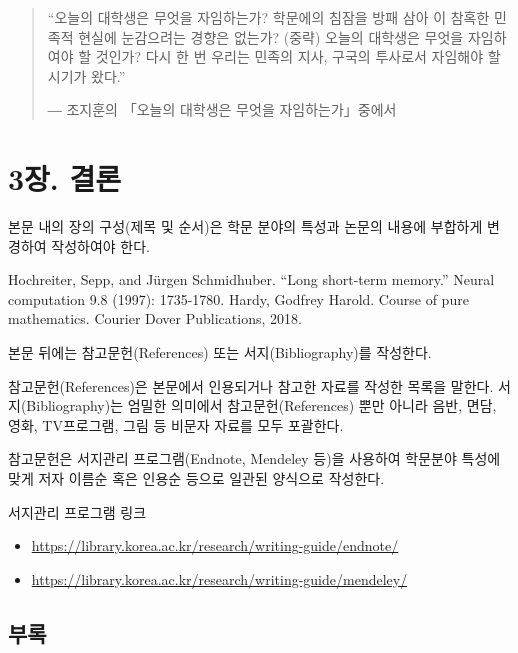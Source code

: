 \documentclass[11pt]{report}
\begin{document}
\begin{quotation}
“오늘의 대학생은 무엇을 자임하는가? 학문에의 침잠을 방패 삼아 이 참혹한 민족적 현실에 눈감으려는 경향은 없는가? (중략) 오늘의 대학생은 무엇을 자임하여야 할 것인가? 다시 한 번 우리는 민족의 지사, 구국의 투사로서 자임해야 할 시기가 왔다.” \par
― 조지훈의  「오늘의 대학생은 무엇을 자임하는가」중에서 
\end{quotation}



\chapter*{3장. 결론}
\setcounter{chapter}{3}
\setcounter{section}{0}
\setcounter{subsection}{0}
본문 내의 장의 구성(제목 및 순서)은 학문 분야의 특성과 논문의 내용에 부합하게 변경하여 작성하여야 한다.\par


\normalsize
\newpage
\renewcommand\bibname{참고문헌}
\begin{thebibliography}{AA}
 Hochreiter, Sepp, and Jürgen Schmidhuber. ``Long short-term memory.'' Neural computation 9.8 (1997): 1735-1780.
 Hardy, Godfrey Harold. Course of pure mathematics. Courier Dover Publications, 2018.
\end{thebibliography}

\bigskip

본문 뒤에는 참고문헌(References) 또는 서지(Bibliography)를 작성한다.\par
참고문헌(References)은 본문에서 인용되거나 참고한 자료를 작성한 목록을 말한다. 서지(Bibliography)는 엄밀한 의미에서 참고문헌(References) 뿐만 아니라 음반, 면담, 영화, TV프로그램, 그림 등 비문자 자료를 모두 포괄한다. \par
참고문헌은 서지관리 프로그램(Endnote, Mendeley 등)을 사용하여 학문분야 특성에 맞게 저자 이름순 혹은 인용순 등으로 일관된 양식으로 작성한다.


\bigskip

서지관리 프로그램 링크
\begin{itemize}
\item\url{https://library.korea.ac.kr/research/writing-guide/endnote/}
\item\url{https://library.korea.ac.kr/research/writing-guide/mendeley/}
\end{itemize}

\begin{center}
\chapter*{부록} %
\end{center}
\end{document}
